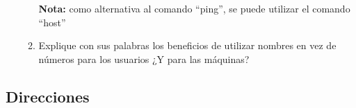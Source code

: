 \documentclass[12pt]{article}
\begin{document}
\begin{enumerate}
\begin{enumerate}
\begin{itemize}
            \end{itemize}

                \textbf{Nota:} como alternativa al comando ``ping'', se puede utilizar el
                comando ``host''

            \item Explique con sus palabras los beneficios de utilizar nombres
                en vez de números para los usuarios ¿Y para las máquinas?

        \end{enumerate}

\end{enumerate}

\subsection*{Direcciones}
\end{document}
